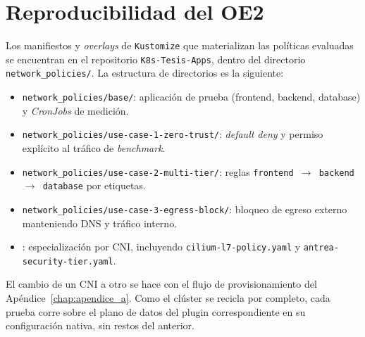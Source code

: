 \section{Reproducibilidad del OE2} \label{sec:apb2_reproducibilidad}

Los manifiestos y \emph{overlays} de \texttt{Kustomize} que materializan las políticas evaluadas se encuentran en el repositorio \texttt{K8s-Tesis-Apps}, dentro del directorio \texttt{network\_policies/}. La estructura de directorios es la siguiente:

\begin{itemize}
    \item \texttt{network\_policies/base/}: aplicación de prueba (frontend, backend, database) y \emph{CronJobs} de medición.
    \item \texttt{network\_policies/use-case-1-zero-trust/}: \emph{default deny} y permiso explícito al tráfico de \emph{benchmark}.
    \item \texttt{network\_policies/use-case-2-multi-tier/}: reglas \texttt{frontend $\to$ backend $\to$ database} por etiquetas.
    \item \texttt{network\_policies/use-case-3-egress-block/}: bloqueo de egreso externo manteniendo DNS y tráfico interno.
    \item {}: especialización por CNI, incluyendo \texttt{cilium-l7-policy.yaml} y \texttt{antrea-security-tier.yaml}.
\end{itemize}

El cambio de un CNI a otro se hace con el flujo de provisionamiento del Apéndice~\ref{chap:apendice_a}. Como el clúster se recicla por completo, cada prueba corre sobre el plano de datos del plugin correspondiente en su configuración nativa, sin restos del anterior.
